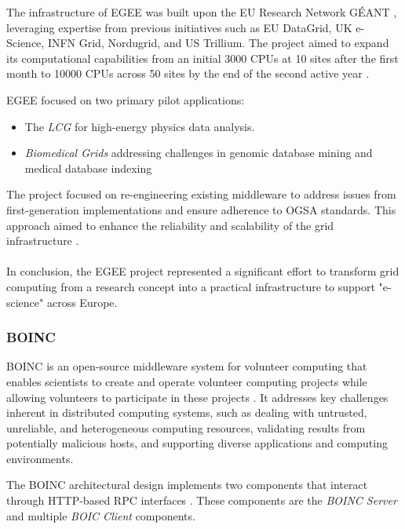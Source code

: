 The infrastructure of \ac{EGEE} was built upon the EU Research Network GÉANT \cite{background:geant}, leveraging expertise from previous initiatives such as EU DataGrid, UK e-Science, INFN Grid, Nordugrid, and US Trillium. The project aimed to expand its computational capabilities from an initial 3000 \acs{CPU}s at 10 sites after the first month to 10000 \acs{CPU}s across 50 sites by the end of the second active year \cite{relatedwork:egee}.

\ac{EGEE} focused on two primary pilot applications: 
\begin{itemize}
  \item The \emph{\ac{LCG}} for high-energy physics data analysis.
  \item \emph{Biomedical Grids} addressing challenges in genomic database mining and medical database indexing
\end{itemize}
The project focused on re-engineering existing middleware to address issues from first-generation implementations and ensure adherence to \ac{OGSA} standards. This approach aimed to enhance the reliability and scalability of the grid infrastructure \cite{relatedwork:egee}.
\\~\\
In conclusion, the \ac{EGEE} project represented a significant effort to transform grid computing from a research concept into a practical infrastructure to support "e-science" across Europe.

\subsubsection{BOINC}
\label{subsec:background:related_work:boinc}
\ac{BOINC} is an open-source middleware system for volunteer computing that enables scientists to create and operate volunteer computing projects while allowing volunteers to participate in these projects \cite{relatedwork:boinc1}. It addresses key challenges inherent in distributed computing systems, such as dealing with untrusted, unreliable, and heterogeneous computing resources, validating results from potentially malicious hosts, and supporting diverse applications and computing environments.

The \ac{BOINC} architectural design implements two components that interact through \acs{HTTP}-based \ac{RPC} interfaces \cite{relatedwork:boinc1}. These components are the \emph{\ac{BOINC} Server} and multiple \emph{\ac{BOIC} Client} components.

